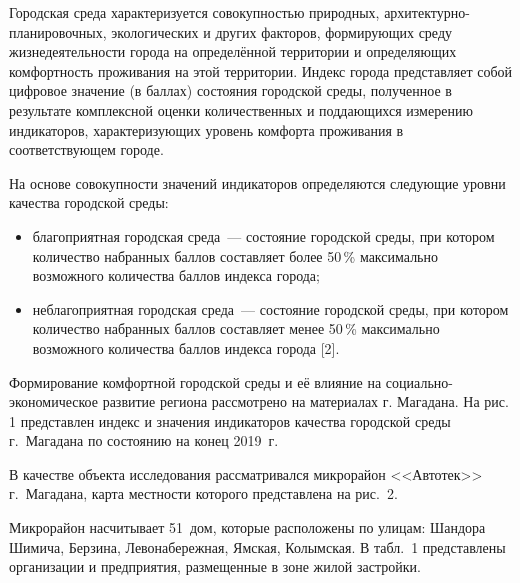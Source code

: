 Городская среда характеризуется совокупностью природных, ар\-хи\-тек\-тур\-но-пла\-ни\-ро\-воч\-ных, экологических и других факторов, формирующих среду жизнедеятельности города на определённой территории и определяющих комфортность проживания на этой территории. Индекс города представляет собой цифровое значение (в баллах) состояния городской среды, полученное в результате комплексной оценки количественных и поддающихся измерению индикаторов, характеризующих уровень комфорта проживания в соответствующем городе.

На основе совокупности значений индикаторов определяются следующие уровни качества городской среды:
\begin{itemize}[noitemsep]\vspace{-8pt}
  \item благоприятная городская среда~--- состояние городской среды, при котором количество набранных баллов составляет более 50\,\% максимально возможного количества баллов индекса города;
  \item неблагоприятная городская среда~--- состояние городской среды, при котором количество набранных баллов составляет менее 50\,\% максимально возможного количества баллов индекса города [2].
\end{itemize}
 \vspace{-8pt}\enlargethispage{\baselineskip}
Формирование комфортной городской среды и её влияние на социально-экономическое развитие региона рассмотрено на материалах г. Магадана. На рис. 1 представлен индекс и значения индикаторов качества городской среды г.~Магадана по состоянию на конец 2019~г.



В качестве объекта исследования рассматривался микрорайон <<Автотек>> г.~Магадана, карта местности которого представлена на рис.~2.



Микрорайон насчитывает 51~дом, которые расположены по улицам: Шандора Шимича, Берзина, Левонабережная, Ямская, Колымская. В табл.~1 представлены организации и предприятия, размещенные в зоне жилой застройки.



